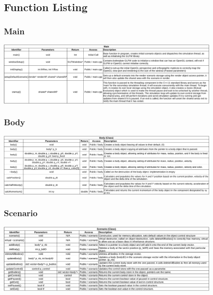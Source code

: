 \begin{figure}
\subsection{Function Listing}
  \subsubsection{Main}
  \centering  
  \includegraphics[width=\textwidth]{img/functions/main.png}
\end{figure}

\begin{figure}
  \subsubsection{Body}
  \centering  
  \includegraphics[width=\textwidth]{img/functions/body.png}
\end{figure}

\begin{figure}
  \subsubsection{Scenario}
  \centering  
  \includegraphics[width=\textwidth]{img/functions/scenario.png}
\end{figure}

